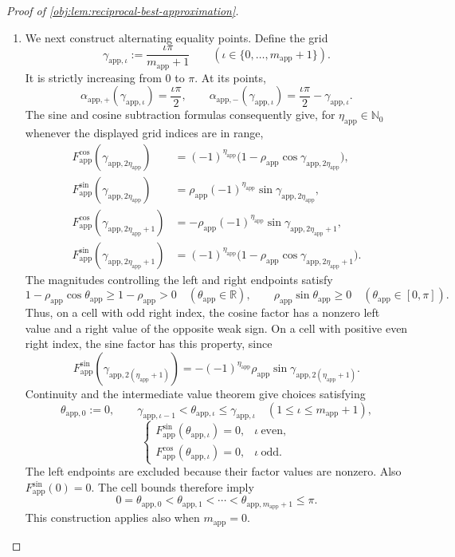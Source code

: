 \documentclass[11pt]{article}
\begin{document}
\begin{proof}[Proof of \cref{obj:lem:reciprocal-best-approximation}]
\begin{enumerate}
\item We next construct alternating equality points. Define the grid
\[
\gamma_{\mathrm{app},\iota}
:=
\frac{\iota\pi}{m_{\mathrm{app}}+1}
\qquad
(\iota\in\{0,\ldots,m_{\mathrm{app}}+1\}).
\]
It is strictly increasing from \(0\) to \(\pi\). At its points,
\[
\alpha_{\mathrm{app},+}(\gamma_{\mathrm{app},\iota})
=\frac{\iota\pi}{2},
\qquad
\alpha_{\mathrm{app},-}(\gamma_{\mathrm{app},\iota})
=\frac{\iota\pi}{2}-\gamma_{\mathrm{app},\iota}.
\]
The sine and cosine subtraction formulas consequently give, for
\(\eta_{\mathrm{app}}\in\mathbb N_0\) whenever the displayed grid indices are in range,
\[
\begin{aligned}
F_{\mathrm{app}}^{\cos}(\gamma_{\mathrm{app},2\eta_{\mathrm{app}}})
&=(-1)^{\eta_{\mathrm{app}}}
\bigl(1-\rho_{\mathrm{app}}
\cos\gamma_{\mathrm{app},2\eta_{\mathrm{app}}}\bigr),\\
F_{\mathrm{app}}^{\sin}(\gamma_{\mathrm{app},2\eta_{\mathrm{app}}})
&=\rho_{\mathrm{app}}(-1)^{\eta_{\mathrm{app}}}
\sin\gamma_{\mathrm{app},2\eta_{\mathrm{app}}},\\
F_{\mathrm{app}}^{\cos}(\gamma_{\mathrm{app},2\eta_{\mathrm{app}}+1})
&=-\rho_{\mathrm{app}}(-1)^{\eta_{\mathrm{app}}}
\sin\gamma_{\mathrm{app},2\eta_{\mathrm{app}}+1},\\
F_{\mathrm{app}}^{\sin}(\gamma_{\mathrm{app},2\eta_{\mathrm{app}}+1})
&=(-1)^{\eta_{\mathrm{app}}}
\bigl(1-\rho_{\mathrm{app}}
\cos\gamma_{\mathrm{app},2\eta_{\mathrm{app}}+1}\bigr).
\end{aligned}
\]
The magnitudes controlling the left and right endpoints satisfy
\[
1-\rho_{\mathrm{app}}\cos\theta_{\mathrm{app}}
\ge1-\rho_{\mathrm{app}}>0
\quad(\theta_{\mathrm{app}}\in\mathbb R),
\qquad
\rho_{\mathrm{app}}\sin\theta_{\mathrm{app}}\ge0
\quad(\theta_{\mathrm{app}}\in[0,\pi]).
\]
Thus, on a cell with odd right index, the cosine factor has a nonzero left value and a right value of the opposite weak sign. On a cell with positive even right index, the sine factor has this property, since
\[
F_{\mathrm{app}}^{\sin}
(\gamma_{\mathrm{app},2(\eta_{\mathrm{app}}+1)})
=
-(-1)^{\eta_{\mathrm{app}}}\rho_{\mathrm{app}}
\sin\gamma_{\mathrm{app},2(\eta_{\mathrm{app}}+1)}.
\]
Continuity and the intermediate value theorem give choices satisfying
\[
\theta_{\mathrm{app},0}:=0,
\qquad
\gamma_{\mathrm{app},\iota-1}
<\theta_{\mathrm{app},\iota}
\le\gamma_{\mathrm{app},\iota}
\quad(1\le\iota\le m_{\mathrm{app}}+1),
\]
\[
\begin{cases}
F_{\mathrm{app}}^{\sin}(\theta_{\mathrm{app},\iota})=0,
&\iota\ \text{even},\\
F_{\mathrm{app}}^{\cos}(\theta_{\mathrm{app},\iota})=0,
&\iota\ \text{odd}.
\end{cases}
\]
The left endpoints are excluded because their factor values are nonzero. Also
\(F_{\mathrm{app}}^{\sin}(0)=0\). The cell bounds therefore imply
\[
0=\theta_{\mathrm{app},0}
<\theta_{\mathrm{app},1}<\cdots
<\theta_{\mathrm{app},m_{\mathrm{app}}+1}\le\pi.
\]
This construction applies also when \(m_{\mathrm{app}}=0\).


\end{enumerate}
\end{proof}
\end{document}
